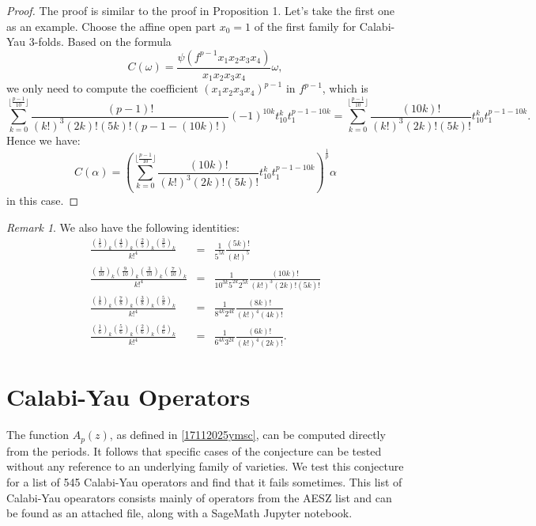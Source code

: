 \documentclass[11pt,leqno]{article}
\theoremstyle{remark}
\newtheorem{rem}{Remark}
\theoremstyle{definition}
\begin{document}
\begin{proof}
The proof is similar to the proof in Proposition 1. Let's take the first one as an example. Choose the affine open part $x_0 = 1$ of the first family for Calabi-Yau 3-folds. Based on the formula
\begin{equation}
C(\omega) = \frac{\psi(f^{p-1}x_1x_2x_3x_{4})}{x_1x_2x_3x_{4}} \omega,
\end{equation}
we only need to compute the coefficient $(x_1x_2x_3x_4)^{p-1}$ in $f^{p-1}$, which is
\[
\sum_{k=0}^{\lfloor \frac{p-1}{10} \rfloor}\frac{(p-1)!}{(k!)^{3}(2k)!(5k)!(p-1-(10k)!)} (-1)^{10k}t_{10}^k t_1^{p-1-10k}= \sum_{k=0}^{\lfloor \frac{p-1}{10} \rfloor}\frac{(10k)!}{(k!)^{3}(2k)!(5k)!} t_{10}^k t_1^{p-1-10k}.
\]
Hence we have:
\[
C(\alpha) = \left( \sum_{k=0}^{\lfloor \frac{p-1}{10} \rfloor} \frac{(10k)!}{(k!)^3(2k)!(5k)!}t_{10}^k t_1^{p-1-10k} \right)^{\frac{1}{p}} \alpha
\]
in this case.
\end{proof}
\begin{rem}
We also have the following identities:
\begin{eqnarray*}
\frac{(\frac{1}{5})_k (\frac{4}{5})_k (\frac{2}{5})_k (\frac{3}{5})_k }{k!^4} &=& \frac{1}{5^{5k}} \frac{(5k)!}{(k!)^5} \\
\frac{(\frac{1}{10})_k (\frac{9}{10})_k (\frac{3}{10})_k (\frac{7}{10})_k }{k!^4} &=& \frac{1}{10^{3k}5^{2k}2^{5k}} \frac{(10k)!}{(k!)^3 (2k)! (5k)!} \\
\frac{(\frac{1}{8})_k (\frac{7}{8})_k (\frac{3}{8})_k (\frac{5}{8})_k }{k!^4} &=& \frac{1}{8^{4k}2^{4k}} \frac{(8k)!}{(k!)^4 (4k)!} \\
\frac{(\frac{1}{6})_k (\frac{5}{6})_k (\frac{2}{6})_k (\frac{4}{6})_k }{k!^4} &=&\frac{1}{6^{4k}3^{2k}} \frac{(6k)!}{(k!)^4 (2k)!}.
\end{eqnarray*}
\end{rem}
    




\section{Calabi-Yau Operators}

The function $A_p(z)$, as defined in \cref{17112025ymsc}, can be computed directly from the periods. It follows that specific cases of the conjecture can be tested without any reference to an underlying family of varieties. We test this conjecture for a list of 545 Calabi-Yau operators and find that it fails sometimes. This list of Calabi-Yau opearators consists mainly of operators from the AESZ list \cite{alenstzu} and can be found as an attached file, along with a SageMath Jupyter notebook.
\end{document}
